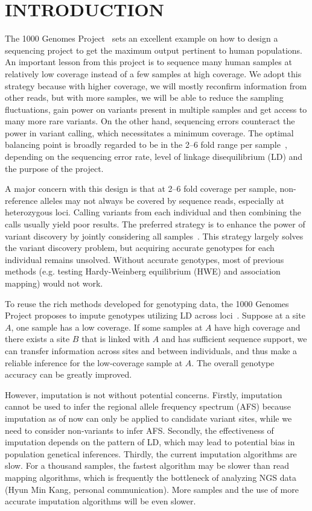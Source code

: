\documentclass{bioinfo}
\begin{document}
\section{INTRODUCTION}

The 1000 Genomes Project~\citep{1000-Genomes-Project-Consortium:2010qc} sets an
excellent example on how to design a sequencing project to get the maximum
output pertinent to human populations. An important lesson from this project is to
sequence many human samples at relatively low coverage instead of a few samples
at high coverage. We adopt this strategy because with higher coverage, we will mostly
reconfirm information from other reads, but with more samples, we will be able to
reduce the sampling fluctuations, gain power on variants present in multiple
samples and get access to many more rare variants. On the other hand,
sequencing errors counteract the power in variant calling, which necessitates a
minimum coverage.  The optimal balancing point is broadly regarded to be in the
2--6 fold range per sample~\citep{Le:2010uq,Li:2011fk}, depending on the
sequencing error rate, level of linkage disequilibrium (LD) and the purpose of the
project.

A major concern with this design is that at 2--6 fold coverage per sample,
non-reference alleles may not always be covered by sequence reads, especially
at heterozygous loci. Calling variants from each individual and then combining
the calls usually yield poor results. The preferred strategy is to enhance the
power of variant discovery by jointly considering all
samples~\citep{Le:2010uq,Li:2011fk,Depristo:2011vn,Nielsen:2011fk}. This
strategy largely solves the variant discovery problem, but acquiring accurate
genotypes for each individual remains unsolved. Without accurate genotypes,
most of previous methods (e.g. testing Hardy-Weinberg equilibrium (HWE)
and association mapping) would not work.

To reuse the rich methods developed for genotyping data, the 1000 Genomes
Project proposes to impute genotypes utilizing LD across
loci~\citep{Li:2009gb,Browning:2009jl,Howie:2009mb,Li:2010ky}.  Suppose at a
site $A$, one sample has a low coverage. If some samples at $A$ have high
coverage and there exists a site $B$ that is linked with $A$ and has sufficient
sequence support, we can transfer information across sites and between
individuals, and thus make a reliable inference for the low-coverage sample at
$A$. The overall genotype accuracy can be greatly improved.

However, imputation is not without potential concerns. Firstly, imputation
cannot be used to infer the regional allele frequency spectrum (AFS) because
imputation as of now can only be applied to candidate variant sites, while we
need to consider non-variants to infer AFS.  Secondly, the effectiveness of
imputation depends on the pattern of LD, which may lead to potential bias in
population genetical inferences. Thirdly, the current imputation algorithms are
slow. For a thousand samples, the fastest algorithm may be slower than read
mapping algorithms, which is frequently the bottleneck of analyzing NGS data
(Hyun Min Kang, personal communication). More samples and the use of more
accurate imputation algorithms will be even slower.
\end{document}
